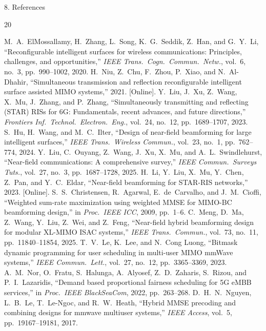 \documentclass[aspectratio=169,11pt]{beamer}
\begin{document}
\begin{frame}[t]{8. References}
\vspace{-0.4em}

\fontsize{6.5pt}{6.2pt}\selectfont
\begin{thebibliography}{20}
\setlength{\parsep}{0pt}
\setlength{\parskip}{0pt}

M.~A.~ElMossallamy, H.~Zhang, L.~Song, K.~G.~Seddik, Z.~Han, and G.~Y.~Li,
``Reconfigurable intelligent surfaces for wireless communications: Principles, challenges, and opportunities,''
\textit{IEEE Trans.\ Cogn.\ Commun.\ Netw.}, vol.~6, no.~3, pp.~990--1002, 2020.
H.~Niu, Z.~Chu, F.~Zhou, P.~Xiao, and N.~Al-Dhahir,
``Simultaneous transmission and reflection reconfigurable intelligent surface assisted MIMO systems,'' 2021. [Online].
Y.~Liu, J.~Xu, Z.~Wang, X.~Mu, J.~Zhang, and P.~Zhang,
``Simultaneously transmitting and reflecting (STAR) RISs for 6G: Fundamentals, recent advances, and future directions,''
\textit{Frontiers Inf.\ Technol.\ Electron.\ Eng.}, vol.~24, no.~12, pp.~1689--1707, 2023.
S.~Hu, H.~Wang, and M.~C.~Ilter,
``Design of near-field beamforming for large intelligent surfaces,''
\textit{IEEE Trans.\ Wireless Commun.}, vol.~23, no.~1, pp.~762--774, 2024.
Y.~Liu, C.~Ouyang, Z.~Wang, J.~Xu, X.~Mu, and A.~L.~Swindlehurst,
``Near-field communications: A comprehensive survey,''
\textit{IEEE Commun.\ Surveys Tuts.}, vol.~27, no.~3, pp.~1687--1728, 2025.
H.~Li, Y.~Liu, X.~Mu, Y.~Chen, Z.~Pan, and Y.~C.~Eldar,
``Near-field beamforming for STAR-RIS networks,'' 2023. [Online].
S.~S.~Christensen, R.~Agarwal, E.~de~Carvalho, and J.~M.~Cioffi,
``Weighted sum-rate maximization using weighted MMSE for MIMO-BC beamforming design,''
in \textit{Proc.\ IEEE ICC}, 2009, pp.~1--6.
C.~Meng, D.~Ma, Z.~Wang, Y.~Liu, Z.~Wei, and Z.~Feng,
``Near-field hybrid beamforming design for modular XL-MIMO ISAC systems,''
\textit{IEEE Trans.\ Commun.}, vol.~73, no.~11, pp.~11840--11854, 2025.
T.~V.~Le, K.~Lee, and N.~Cong Luong,
``Bitmask dynamic programming for user scheduling in multi-user MIMO mmWave systems,''
\textit{IEEE Commun.\ Lett.}, vol.~27, no.~12, pp.~3365--3369, 2023.
A.~M.~Nor, O.~Fratu, S.~Halunga, A.~Alyosef, Z.~D.~Zaharis, S.~Rizou, and P.~I.~Lazaridis,
``Demand based proportional fairness scheduling for 5G eMBB services,''
in \textit{Proc.\ IEEE BlackSeaCom}, 2022, pp.~263--268.
D.~H.~N.~Nguyen, L.~B.~Le, T.~Le-Ngoc, and R.~W.~Heath,
``Hybrid MMSE precoding and combining designs for mmwave multiuser systems,''
\textit{IEEE Access}, vol.~5, pp.~19167--19181, 2017.
\end{thebibliography}
\end{frame}
\end{document}
